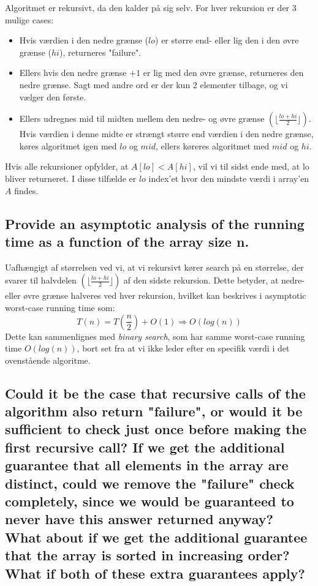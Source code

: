 \documentclass[a4paper,12pt]{article}
\begin{document}
Algoritmet er rekursivt, da den kalder på sig selv. For hver rekursion er der 3 mulige cases:
\begin{itemize}
    \item Hvis værdien i den nedre grænse ($lo$) er større end- eller lig den i den øvre grænse ($hi$), returneres "failure". 
    \item Ellers hvis den nedre grænse $+ 1$ er lig med den øvre grænse, returneres den nedre grænse. Sagt med andre ord er der kun 2 elementer tilbage, og vi vælger den første.
    \item Ellers udregnes mid til midten mellem den nedre- og øvre grænse $(\lfloor\frac{lo + hi}{2}\rfloor)$. Hvis værdien i denne midte er strængt større end værdien i den nedre grænse, køres algoritmet igen med $lo$ og $mid$, ellers køreres algoritmet med $mid$ og $hi$.
\end{itemize}
Hvis alle rekursioner opfylder, at $A[lo] < A[hi]$, vil vi til sidst ende med, at lo bliver returneret. I disse tilfælde er $lo$ index'et hvor den mindste værdi i array'en $A$ findes.
    
\subsection[]{Provide an asymptotic analysis of the running time as a function of the array size n.}

Uafhængigt af størrelsen ved vi, at vi rekursivt kører search på en størrelse, der svarer til halvdelen $(\lfloor\frac{lo + hi}{2}\rfloor)$ af den sidste rekursion. Dette betyder, at nedre- eller øvre grænse halveres ved hver rekursion, hvilket kan beskrives i asymptotic worst-case running time som:
\[T(n)=T(\dfrac{n}{2})+O(1)\Rightarrow O(log(n))\]
Dette kan sammenlignes med \textit{binary search}, som har samme worst-case running time $O(log(n))$, bort set fra at vi ikke leder efter en specifik værdi i det ovenstående algoritme.

\subsection[]{Could it be the case that recursive calls of the algorithm also return "failure", or would it
be sufficient to check just once before making the first recursive call? If we get the additional
guarantee that all elements in the array are distinct, could we remove the "failure" check
completely, since we would be guaranteed to never have this answer returned anyway?
What about if we get the additional guarantee that the array is sorted in increasing order?
What if both of these extra guarantees apply?}
\end{document}
